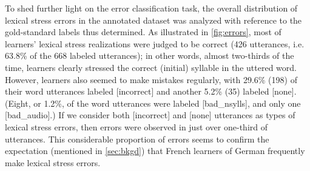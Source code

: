 \documentclass[a4paper]{article}
\newcommand{\TODO}[1]{{\color{red}\textbf{[TODO #1]}}}
\begin{document}
		
		To shed further light on the error classification task, the overall distribution of lexical stress errors in the annotated dataset 
		was analyzed with reference to the gold-standard labels thus determined.
		As 
		illustrated in \cref{fig:errors}, 
		most of learners' lexical stress realizations were judged to be correct (426 utterances, i.e. 63.8\% of the 668 labeled utterances);
		in other words, almost two-thirds of the time, learners clearly stressed the correct (initial) syllable in the uttered word.
		However, learners also seemed to make mistakes regularly, with 29.6\% (198) of their word utterances labeled [incorrect] and another 5.2\% (35) labeled [none].
		(Eight, or 1.2\%, of the word utterances were labeled [bad\_nsylls], and only one [bad\_audio].)
		If we consider both [incorrect] and [none] utterances as types of lexical stress errors, then errors were observed in just over one-third of utterances. %
		This considerable proportion of errors seems to confirm the expectation (mentioned in \cref{sec:bkgd}) that French learners of German frequently make lexical stress errors.
		
		
\end{document}
